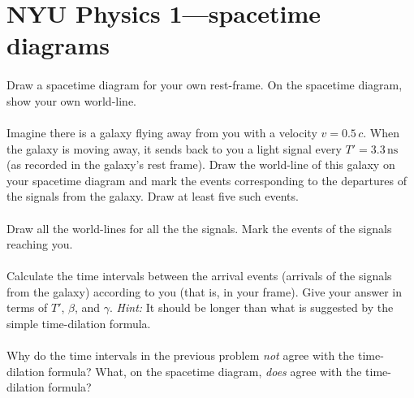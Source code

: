 \documentclass[12pt]{article}
\newcommand{\ns}{\mathrm{ns}}
\newcounter{problem}
\begin{document}
\sloppy\sloppypar\raggedbottom\frenchspacing\thispagestyle{empty}

\section*{NYU Physics 1---spacetime diagrams}

\paragraph{\theproblem}%
Draw a spacetime diagram for your own rest-frame.  On the spacetime
diagram, show your own world-line.

\paragraph{\theproblem}%
Imagine there is a galaxy flying away from you with a velocity $v =
0.5\,c$. When the galaxy is moving away, it sends back to you a light
signal every $T'=3.3\,\ns$ (as recorded in the galaxy's rest frame).
Draw the world-line of this galaxy on your spacetime diagram and mark
the events corresponding to the departures of the signals from the
galaxy.  Draw at least five such events.

\paragraph{\theproblem}%
Draw all the world-lines for all the the signals.  Mark the events of
the signals reaching you.

\paragraph{\theproblem}%
Calculate the time intervals between the arrival events (arrivals of
the signals from the galaxy) according to you (that is, in your
frame).  Give your answer in terms of $T'$, $\beta$, and $\gamma$.
\textsl{Hint:} It should be longer than what is suggested by the
simple time-dilation formula.

\paragraph{\theproblem}%
Why do the time intervals in the previous problem \emph{not} agree
with the time-dilation formula?  What, on the spacetime diagram,
\emph{does} agree with the time-dilation formula?
\end{document}
